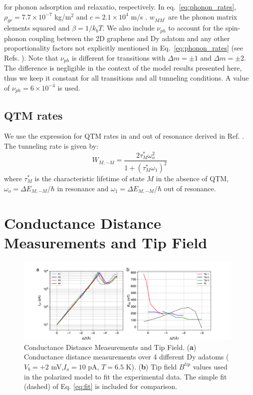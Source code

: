\documentclass[reprint,amsmath,amssymb,aps,nofootinbib,onecolumn]{revtex4-2}
\begin{document}
\noindent
for phonon adsorption and relaxatio, respectively. In eq.~\ref{eq:phonon_rates}, $\rho_{gr} = 7.7 \times 10^{-7}$ kg/m$^2$ and $c = 2.1 \times 10^4$ m/s \cite{Falkovsky2007}. $w_{MM^{\prime}}$ are the phonon matrix elements squared and $\beta = 1/ k_{b} T$. We also include $\nu_{ph}$ to account for the spin-phonon coupling between the 2D graphene and Dy adatom and any other proportionality factors not explicitly mentioned in Eq.~\ref{eq:phonon_rates} (see Refs. \cite{Leuenberger2000,cervetti2016}). Note that $\nu_{ph}$ is different for transitions with $\Delta m = \pm 1$ and $\Delta m = \pm 2$. The difference is negligible in the context of the model results presented here, thus we keep it constant for all transitions and all tunneling conditions. A value of $\nu_{ph} = 6 \times 10^{-4}$ is used. \par

\subsection{QTM rates}
We use the expression for QTM rates in and out of resonance derived in Ref. \cite{abragam1961,fort1998}. The tunneling rate is given by:
\begin{equation}
W_{M,-M} =  \frac{2 \tau^{*}_{M} \omega^{2}_{o}}{1 + (\tau^{*}_{M} \omega_{1})^2}
\label{eq:qtm}
\end{equation}
where $\tau^{*}_{M}$ is the characteristic lifetime of state $M$ in the absence of QTM, $\omega_{o} = \Delta E_{M,-M}/\hbar$ in resonance and $\omega_{1} = \Delta E_{M,-M}/\hbar$ out of resonance. 
\section{Conductance Distance Measurements and Tip Field}
\label{sec:cond-dist}
\begin{figure}[ht!]
\includegraphics[width=0.98\textwidth]{fields_fit2.pdf}
\caption{Conductance Distance Measurements and Tip Field. (\textbf{a}) Conductance distance measurements over 4 different Dy adatoms ($V_{b} = +2$ mV,$I_o = 10$ pA, $T = 6.5$ K). (\textbf{b}) Tip field $B^{tip}$ values used in the polarized model to fit the experimental data. The simple fit (dashed) of Eq. \ref{eq:fit} is included for comparison. 
\label{fig:fields} }
\end{figure}
\end{document}
